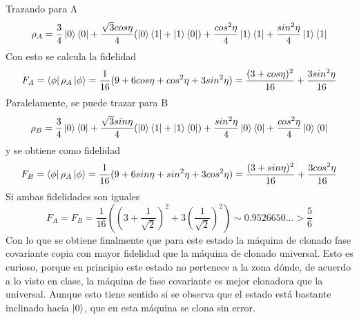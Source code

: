 \documentclass{book}
\begin{document}
\begin{enumerate}
Trazando para A
$$\rho_A= \frac{3}{4}\ket{0}\bra{0}+\frac{\sqrt{3}cos\eta}{4}(\ket{0}\bra{1}+\ket{1}\bra{0})+\frac{cos^2\eta}{4}\ket{1}\bra{1}+\frac{sin^2\eta}{4}\ket{1}\bra{1}$$
Con esto se calcula la fidelidad
$$F_A=\bra{\phi}\rho_A\ket{\phi}=\frac{1}{16}(9+6cos\eta+cos^2\eta+3sin^2\eta)=\frac{(3+cos\eta)^2}{16}+\frac{3sin^2\eta}{16}$$
Paralelamente, se puede trazar para B
$$\rho_B= \frac{3}{4}\ket{0}\bra{0}+\frac{\sqrt{3}sin\eta}{4}(\ket{0}\bra{1}+\ket{1}\bra{0})+\frac{sin^2\eta}{4}\ket{0}\bra{0}+\frac{cos^2\eta}{4}\ket{0}\bra{0}$$
y se obtiene como fidelidad
$$F_B=\bra{\phi}\rho_A\ket{\phi}=\frac{1}{16}(9+6sin\eta+sin^2\eta+3cos^2\eta)=\frac{(3+sin\eta)^2}{16}+\frac{3cos^2\eta}{16}$$
Si ambas fidelidades son iguales
$$F_A=F_B=\frac{1}{16}((3+\frac{1}{\sqrt{2}})^2+3(\frac{1}{\sqrt{2}})^2)\sim 0.9526650...>\frac{5}{6}$$
Con lo que se obtiene finalmente que para este estado la máquina de clonado fase covariante copia con mayor fidelidad que la máquina de clonado universal. Esto es curioso, porque en principio este estado no pertenece a la zona dónde, de acuerdo a lo visto en clase, la máquina de fase covariante es mejor clonadora que la universal. Aunque esto tiene sentido si se observa que el estado está bastante inclinado hacia $\ket{0}$, que en esta máquina se clona sin error.
\end{enumerate}
\end{document}
